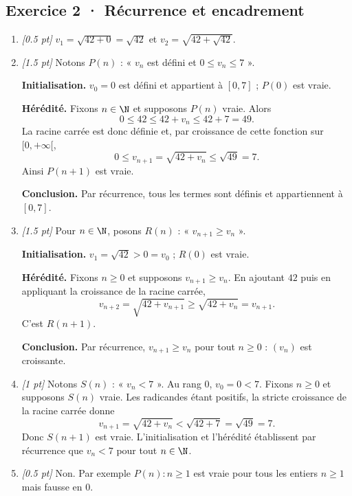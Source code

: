 \subsection*{Exercice 2 · Récurrence et encadrement}\begin{enumerate}

\item \textit{[\num{0,5} pt]} $v_1=\sqrt{42+0}=\sqrt{42}$ et $v_2=\sqrt{42+\sqrt{42}}$.

\item \textit{[\num{1,5} pt]} Notons $P(n)$ : « $v_n$ est défini et $0\le v_n\le 7$ ».
\par\smallskip\textbf{Initialisation.} $v_0=0$ est défini et appartient à $[0,7]$ ; $P(0)$ est vraie.
\par\smallskip\textbf{Hérédité.} Fixons $n\in\N$ et supposons $P(n)$ vraie. Alors
\[0\le 42\le 42+v_n\le 42+7=49.\]
La racine carrée est donc définie et, par croissance de cette fonction sur $[0,+\infty[$,
\[0\le v_{n+1}=\sqrt{42+v_n}\le\sqrt{49}=7.\]
Ainsi $P(n+1)$ est vraie.
\par\smallskip\textbf{Conclusion.} Par récurrence, tous les termes sont définis et appartiennent à $[0,7]$.

\item \textit{[\num{1,5} pt]} Pour $n\in\N$, posons $R(n)$ : « $v_{n+1}\ge v_n$ ».
\par\smallskip\textbf{Initialisation.} $v_1=\sqrt{42}>0=v_0$ ; $R(0)$ est vraie.
\par\smallskip\textbf{Hérédité.} Fixons $n\ge0$ et supposons $v_{n+1}\ge v_n$. En ajoutant $42$ puis en appliquant la croissance de la racine carrée,
\[v_{n+2}=\sqrt{42+v_{n+1}}\ge\sqrt{42+v_n}=v_{n+1}.\]
C'est $R(n+1)$.
\par\smallskip\textbf{Conclusion.} Par récurrence, $v_{n+1}\ge v_n$ pour tout $n\ge0$ : $(v_n)$ est croissante.

\item \textit{[1 pt]} Notons $S(n)$ : « $v_n<7$ ». Au rang $0$, $v_0=0<7$.
Fixons $n\ge0$ et supposons $S(n)$ vraie. Les radicandes étant positifs, la stricte croissance de la racine carrée donne
\[v_{n+1}=\sqrt{42+v_n}<\sqrt{42+7}=\sqrt{49}=7.\]
Donc $S(n+1)$ est vraie. L'initialisation et l'hérédité établissent par récurrence que $v_n<7$ pour tout $n\in\N$.

\item \textit{[\num{0,5} pt]} Non. Par exemple $P(n):n\ge1$ est vraie pour tous les entiers $n\ge1$ mais fausse en $0$.

\end{enumerate}

